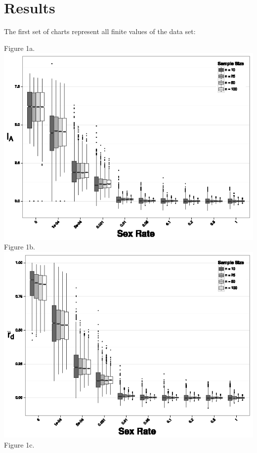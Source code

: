 \documentclass[letterpaper, 10pt]{article}
\newcommand{\tab}{\hspace*{1.5em}}
\begin{document}
\section{Results}
\tab 

The first set of charts represent all finite values of the data set:

\begin{center}
Figure 1a.\\
\includegraphics{figures/Ia_chart.eps}\\Figure 1b.\\
\includegraphics{figures/rbarD_chart.eps}\\Figure 1c.\\

\end{center}
\end{document}
